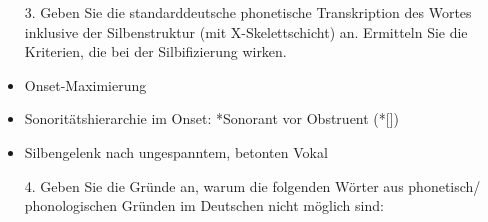 {%

\begin{frame}
	\begin{itemize}	
		\item[3.] Geben Sie die standarddeutsche phonetische Transkription des Wortes  inklusive der Silbenstruktur (mit X-Skelettschicht) an. Ermitteln Sie die Kriterien, die bei der Silbifizierung wirken.
	\end{itemize}
		
		\begin{minipage}{.5\textwidth}
			\begin{figure}
			\end{figure}
		\end{minipage}
	\begin{minipage}{.45\textwidth}
		\begin{itemize}
			\item Onset-Maximierung
			\item Sonoritätshierarchie im Onset: *Sonorant vor Obstruent (*[])
			\item Silbengelenk nach ungespanntem, betonten Vokal
		\end{itemize}
	\end{minipage}

\end{frame}


\begin{frame}
	\begin{itemize}
					
		\item[4.] Geben Sie die Gründe an, warum die folgenden Wörter aus phonetisch/ phonologischen Gründen im Deutschen nicht möglich sind:
			
		\begin{exe}
			\exi{(\ref{ex:HA3})}
			\begin{xlist}
\ex[*]{\textipa{[a\;R.'tUng]}: \textcolor{red}{Auslautverhärtung, regressive velarare nasale Assimilation, Knacklaut}}
			\end{xlist}

		\end{exe}
	
	\end{itemize}
		
\end{frame}
	
}


